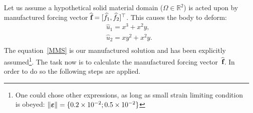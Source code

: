 Let us assume a hypothetical solid material domain ($\Omega\in\mathbb{R}^2$) is acted upon by manufactured forcing vector $\widehat{\textbf{f}}=[\widehat{f}_1,\widehat{f}_2]^\top$. This causes the body to deform:
%
\begin{equation}\label{MMS}
\begin{aligned}
&\widehat{u}_1=x^3+x^2y,\\
&\widehat{u}_2=xy^2+x^2y.\\
\end{aligned}
\end{equation}
%
The equation~\eqref{MMS} is our manufactured solution and has been explicitly assumed\footnote{One could chose other expressions, as long as small strain limiting condition is obeyed: $\|\boldsymbol{\varepsilon}\|=\{0.2\times10^{-2};0.5\times10^{-2}\}$}. The task now is to calculate the manufactured forcing vector~$\widehat{\textbf{f}}$. In order to do so the following steps are applied.

